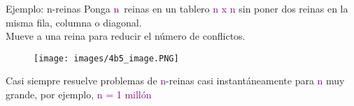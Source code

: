 \begin{frame}{Ejemplo: n-reinas}
Ponga \textcolor{Purple}{n}\, reinas en un tablero \textcolor{Purple}{n x n} sin poner dos reinas en la misma fila, columna o diagonal.\\
Mueve a una reina para reducir el número de conflictos.\\
\begin{figure}
    \centering
    \texttt{[image: images/4b5\_image.PNG]}
\end{figure}
Casi siempre resuelve problemas de \textcolor{Purple}{n}-reinas casi instantáneamente para \textcolor{Purple}{n} muy grande, por ejemplo, \textcolor{Purple}{n = 1 millón}
\end{frame}